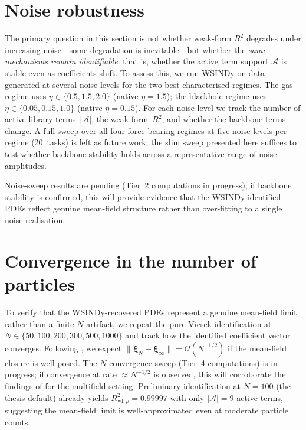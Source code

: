 \section{Noise robustness}
\label{sec:wsindy_noise}

The primary question in this section is not whether weak-form $R^2$ degrades
under increasing noise---some degradation is inevitable---but whether the
\emph{same mechanisms remain identifiable}: that is, whether the active term
support $\mathcal{A}$ is stable even as coefficients shift.
To assess this, we run WSINDy on data generated at several noise
levels for the two best-characterised regimes.  The gas regime uses
$\eta \in \{0.5, 1.5, 2.0\}$ (native $\eta{=}1.5$); the blackhole
regime uses $\eta \in \{0.05, 0.15, 1.0\}$ (native $\eta{=}0.15$).
For each noise level we track the number of active library
terms~$|\mathcal{A}|$, the weak-form~$R^2$, and whether the backbone
terms change.  A full sweep over all four force-bearing regimes at five
noise levels per regime (20~tasks) is left as future work; the slim
sweep presented here suffices to test whether backbone stability holds
across a representative range of noise amplitudes.

Noise-sweep results are pending (Tier~2 computations in progress);
if backbone stability is confirmed, this will provide evidence that the
WSINDy-identified PDEs reflect genuine mean-field structure rather than
over-fitting to a single noise realisation.

\section{Convergence in the number of particles}
\label{sec:wsindy_n_convergence}

To verify that the WSINDy-recovered PDEs represent a genuine mean-field
limit rather than a finite-$N$ artifact, we repeat the pure Vicsek
identification at $N\in\{50, 100, 200, 300, 500, 1000\}$ and track how
the identified coefficient vector converges.  Following
\cite{messenger2021wsindy}, we expect $\|\boldsymbol{\xi}_N -
\boldsymbol{\xi}_\infty\| = \mathcal{O}(N^{-1/2})$ if the mean-field
closure is well-posed.
The $N$-convergence sweep (Tier~4 computations) is in progress;
if convergence at rate $\approx N^{-1/2}$ is observed, this
will corroborate the findings of \cite{messenger2021wsindy} for the
multifield setting.  Preliminary identification at $N{=}100$ (the thesis-default)
already yields $R^2_{\text{wf},\rho}=0.99997$ with only $|\mathcal{A}|{=}9$
active terms, suggesting the mean-field limit is well-approximated even at
moderate particle counts.


